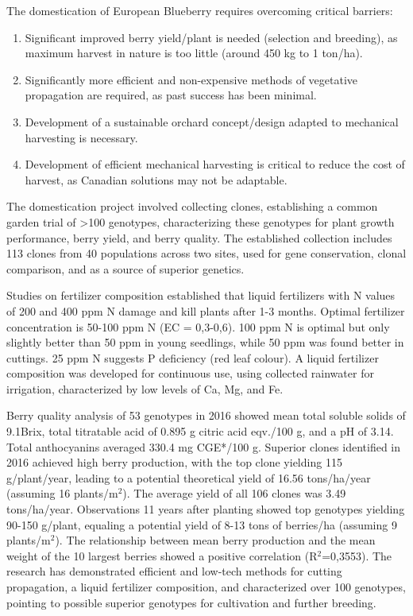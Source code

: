 \vspace{0.5em}
The domestication of European Blueberry requires overcoming critical barriers: 

\begin{enumerate} 
    \item Significant improved berry yield/plant is needed (selection and breeding), as maximum harvest in nature is too little (around 450 kg to 1 ton/ha). 
    \item Significantly more efficient and non-expensive methods of vegetative propagation are required, as past success has been minimal. 
    \item Development of a sustainable orchard concept/design adapted to mechanical harvesting is necessary. 
    \item Development of efficient mechanical harvesting is critical to reduce the cost of harvest, as Canadian solutions may not be adaptable. 
\end{enumerate} 

\vspace{0.5em}
The domestication project involved collecting clones, establishing a common garden trial of >100 genotypes, characterizing these genotypes for plant growth performance, berry yield, and berry quality. The established collection includes 113 clones from 40 populations across two sites, used for gene conservation, clonal comparison, and as a source of superior genetics.

\vspace{0.5em}
Studies on fertilizer composition established that liquid fertilizers with N values of 200 and 400 ppm N damage and kill plants after 1-3 months. Optimal fertilizer concentration is 50-100 ppm N (EC = 0,3-0,6). 100 ppm N is optimal but only slightly better than 50 ppm in young seedlings, while 50 ppm was found better in cuttings. 25 ppm N suggests P deficiency (red leaf colour). A liquid fertilizer composition was developed for continuous use, using collected rainwater for irrigation, characterized by low levels of Ca, Mg, and Fe.

\vspace{0.5em}
Berry quality analysis of 53 genotypes in 2016 showed mean total soluble solids of 9.1\textdegree Brix, total titratable acid of 0.895 g citric acid eqv./100 g, and a pH of 3.14. Total anthocyanins averaged 330.4 mg CGE*/100 g. Superior clones identified in 2016 achieved high berry production, with the top clone yielding 115 g/plant/year, leading to a potential theoretical yield of 16.56 tons/ha/year (assuming 16 plants/m$^2$). The average yield of all 106 clones was 3.49 tons/ha/year. Observations 11 years after planting showed top genotypes yielding 90-150 g/plant, equaling a potential yield of 8-13 tons of berries/ha (assuming 9 plants/m$^2$). The relationship between mean berry production and the mean weight of the 10 largest berries showed a positive correlation (R$^2$=0,3553). The research has demonstrated efficient and low-tech methods for cutting propagation, a liquid fertilizer composition, and characterized over 100 genotypes, pointing to possible superior genotypes for cultivation and further breeding.



